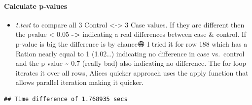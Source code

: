 \documentclass[
]{article}
\newenvironment{Shaded}{\begin{snugshade}}{\end{snugshade}}
\newcommand{\AttributeTok}[1]{\textcolor[rgb]{0.77,0.63,0.00}{#1}}
\newcommand{\CommentTok}[1]{\textcolor[rgb]{0.56,0.35,0.01}{\textit{#1}}}
\newcommand{\ControlFlowTok}[1]{\textcolor[rgb]{0.13,0.29,0.53}{\textbf{#1}}}
\newcommand{\DecValTok}[1]{\textcolor[rgb]{0.00,0.00,0.81}{#1}}
\newcommand{\FunctionTok}[1]{\textcolor[rgb]{0.00,0.00,0.00}{#1}}
\newcommand{\NormalTok}[1]{#1}
\newcommand{\OtherTok}[1]{\textcolor[rgb]{0.56,0.35,0.01}{#1}}
\newcommand{\SpecialCharTok}[1]{\textcolor[rgb]{0.00,0.00,0.00}{#1}}
\newcommand{\StringTok}[1]{\textcolor[rgb]{0.31,0.60,0.02}{#1}}
\providecommand{\tightlist}{%
  \setlength{\itemsep}{0pt}\setlength{\parskip}{0pt}}
\begin{document}
\hypertarget{calculate-p-values}{%
\paragraph{Calculate p-values}\label{calculate-p-values}}

\begin{itemize}
\tightlist
\item
  \emph{t.test} to compare all 3 Control \textless-\textgreater{} 3 Case
  values. If they are different then the pvalue \textless{} 0.05
  \textbf{-\textgreater{}} indicating a real differences between case \&
  control. If p-value is big the difference is by chance😄 I tried it
  for row 188 which has a Ration nearly equal to 1 (1.02\ldots)
  indicating no difference in case vs.~control and the p value
  \textasciitilde{} 0.7 (really bad) also indicating no difference. The
  for loop iterates it over all rows, Alices quicker approach uses the
  apply function that allows parallel iteration making it quicker.
\end{itemize}

\begin{Shaded}
\end{Shaded}

\begin{verbatim}
## Time difference of 1.768935 secs
\end{verbatim}
\end{document}
